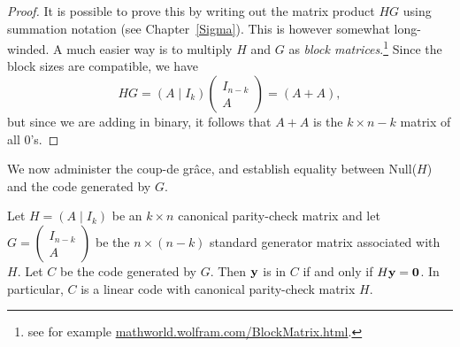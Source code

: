 \begin{proof}
It is possible to prove this by writing out the matrix product $HG$ using summation notation (see Chapter~\ref{Sigma}). This is however somewhat long-winded. A much easier way is to multiply $H$ and $G$ as \emph{block matrices}.\footnote{see for example \url{mathworld.wolfram.com/BlockMatrix.html}.} Since the block sizes are compatible, we have
\[ HG = (A \mid I_k )\left(
 \begin{array}{c}
 I_{n-k} \\
A
 \end{array} \right) = (A + A),\]
but since we are adding in binary, it follows that $A + A$ is the $k \times n-k$ matrix of all 0's.
\end{proof}
 
 We now administer the coup-de gr\^{a}ce, and establish equality between Null($H$) and the code generated by $G$.
  
 \begin{prop}{}
Let $H = (A \mid I_k )$ be an $k \times n$ canonical parity-check
matrix and let $G = \left(
\begin{array}{c}
I_{n-k} \\
A
\end{array}  \right) $ be the $n
\times (n-k)$ standard generator matrix associated with $H$. Let $C$
be the code generated by $G$. Then ${\bold y}$ is in $C$ if and only
if $H {\bold y} = {\bold 0}$. In particular, $C$ is a linear code with
canonical parity-check matrix $H$. 
\end{prop}
 
